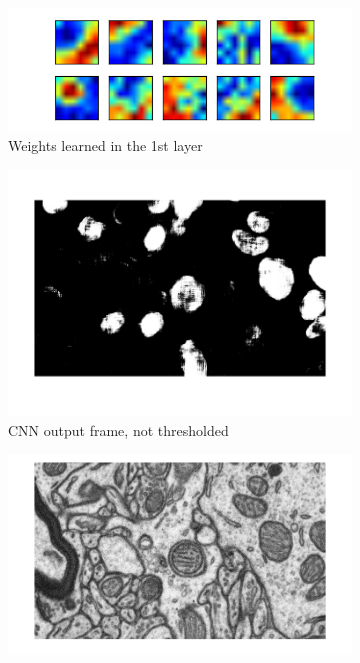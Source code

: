 \begin{figure}[h!]
  \centering
  \begin{subfigure}[b]{0.40\textwidth}
   \includegraphics[width=\textwidth]{images/filters.png}
    \caption{Weights learned in the 1st layer}
  \end{subfigure}
  \begin{subfigure}[b]{0.40\textwidth}
    \includegraphics[width=\textwidth]{images/frame1.png}
    \caption{CNN output frame, not thresholded}
  \end{subfigure}
    \begin{subfigure}[b]{0.40\textwidth}
   \includegraphics[width=\textwidth]{images/GT_truth.png}

\end{subfigure}
\end{figure}
